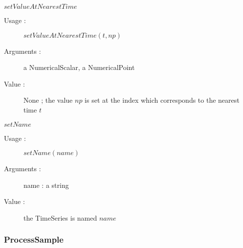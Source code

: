 \begin{description}
\begin{description}
  \item $setValueAtNearestTime$
    \begin{description}
    \item[Usage :] $setValueAtNearestTime(t, np)$
    \item[Arguments :] a NumericalScalar, a NumericalPoint
    \item[Value :] None ; the value $np$ is set at the index which corresponds to the nearest time $t$
    \end{description}
    \bigskip

  \item $setName$
    \begin{description}
    \item[Usage :] $setName(name)$
    \item[Arguments :] name : a string
    \item[Value :] the TimeSeries is named $name$
    \end{description}
    \bigskip



  \end{description}

\end{description}


\newpage \subsubsection{ProcessSample}

